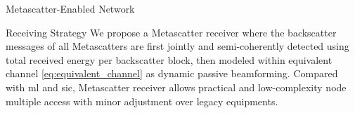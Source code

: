 \documentclass[journal]{IEEEtran}
\begin{document}
\begin{section}{Metascatter-Enabled Network}
	\begin{subsection}{Receiving Strategy}
		We propose a Metascatter receiver where the backscatter messages of all Metascatters are first jointly and semi-coherently detected using total received energy per backscatter block, then modeled within equivalent channel \eqref{eq:equivalent_channel} as dynamic passive beamforming.
		Compared with \gls{ml} and \gls{sic}, Metascatter receiver allows practical and low-complexity node multiple access with minor adjustment over legacy equipments.


\end{subsection}
\end{section}
\end{document}
